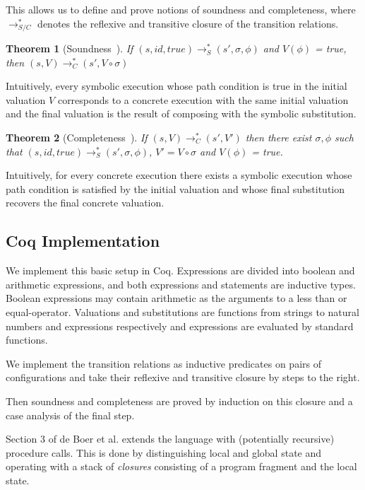 \documentclass[submission,copyright,creativecommons]{eptcs}
\newtheorem{theorem}{Theorem}
\begin{document}
This allows us to define and prove notions of soundness and completeness, where
$\rightarrow_{S/C}^{*}$ denotes the reflexive and transitive closure of the transition relations.
\begin{theorem}[Soundness~{\cite[Thm. 2.3]{boer2021}}]
  If $(s, id, true) \rightarrow_{S}^{*} (s', \sigma, \phi)$ and $V(\phi)$ = true,
  then $(s, V) \rightarrow_{C}^{*} (s', V \circ \sigma)$
\end{theorem}

Intuitively, every symbolic execution whose path condition is true in the initial valuation $V$
corresponds to a concrete execution with the same initial valuation and the final valuation is
the result of composing with the symbolic substitution.

\begin{theorem}[Completeness~{\cite[Thm. 2.4]{boer2021}}]
  If $(s, V) \rightarrow_{C}^{*} (s', V')$ then there exist $\sigma, \phi$ such that
  $(s, id, true) \rightarrow_{S}^{*} (s', \sigma, \phi)$, $V' = V \circ \sigma$ and $V(\phi)$ = true.
\end{theorem}

Intuitively, for every concrete execution there exists a symbolic execution whose path condition
is satisfied by the initial valuation and whose final substitution recovers the final concrete valuation.

\subsection{Coq Implementation}
We implement this basic setup in Coq. Expressions are divided into boolean and arithmetic expressions,
and both expressions and statements are inductive types. Boolean expressions may contain arithmetic as the
arguments to a less than or equal-operator.
Valuations and substitutions are functions from strings to natural numbers and expressions respectively and
expressions are evaluated by standard functions.

We implement the transition relations as inductive predicates on pairs of configurations and take their
reflexive and transitive closure by steps to the right.

Then soundness and completeness are proved by induction on this closure and a case analysis of the final step.

Section 3 of de Boer et al. extends the language with (potentially recursive) procedure calls.
This is done by distinguishing local and global state and operating with a stack of \emph{closures} consisting
of a program fragment and the local state.
\end{document}
